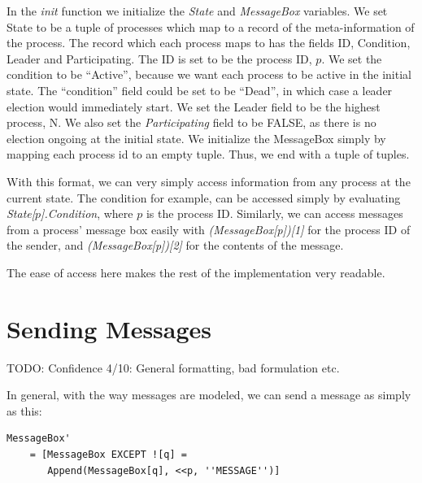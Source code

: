 \documentclass{report}
\begin{document}
In the \textit{init} function we initialize the \textit{State} and \textit{MessageBox} variables. We set State to be a tuple of processes which map to a record of the meta-information of the process. The record which each process maps to has the fields ID, Condition, Leader and Participating. The ID is set to be the process ID, $p$. We set the condition to be ``Active'', because we want each process to be active in the initial state. The ``condition'' field could be set to be ``Dead'', in which case a leader election would immediately start. We set the Leader field to be the highest process, N. We also set the \textit{Participating} field to be FALSE, as there is no election ongoing at the initial state.
We initialize the MessageBox simply by mapping each process id to an empty tuple. Thus, we end with a tuple of tuples.

With this format, we can very simply access information from any process at the current state. The condition for example, can be accessed simply by evaluating {\textit{State[$p$].Condition}}, where $p$ is the process ID. Similarly, we can access messages from a process' message box easily with \textit{(MessageBox[p])[1]} for the process ID of the sender, and \textit{(MessageBox[p])[2]} for the contents of the message.

The ease of access here makes the rest of the implementation very readable.

\section{Sending Messages}

TODO: Confidence 4/10: General formatting, bad formulation etc.

\noindent{}

In general, with the way messages are modeled, we can send a message as simply as this:
\begin{lstlisting}
MessageBox'
    = [MessageBox EXCEPT ![q] =
       Append(MessageBox[q], <<p, ''MESSAGE'')]
\end{lstlisting}
\end{document}
